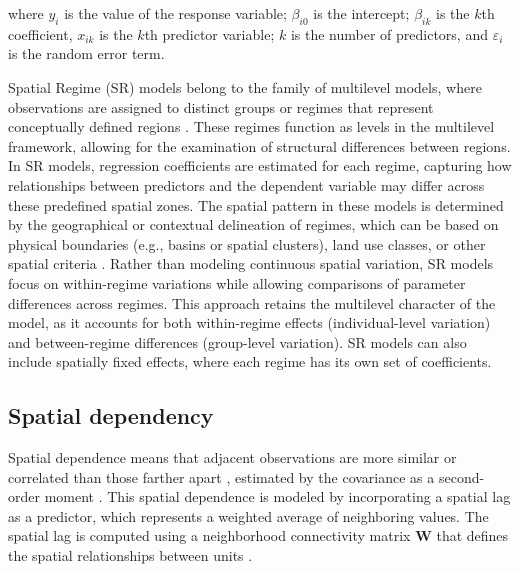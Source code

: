 \documentclass[lineno,pdflatex,sn-basic]{sn-jnl}%
\theoremstyle{thmstyleone}%
\theoremstyle{thmstyletwo}%
\theoremstyle{thmstylethree}%
\begin{document}
where $y_i$ is the value of the response variable;
$\beta_{i0}$ is the intercept; 
$\beta_{ik}$ is the $k$th coefficient, $x_{ik}$ is the $k$th predictor variable; $k$ is the number of predictors,
and $\varepsilon_i$ is the random error term. 

Spatial Regime (SR) models belong to the family of multilevel models, where observations are assigned to distinct groups or regimes that represent conceptually defined regions \citep{anselin1996simple}.
These regimes function as levels in the multilevel framework, allowing for the examination of structural differences between regions. 
In SR models, regression coefficients are estimated for each regime, capturing how relationships between predictors and the dependent variable may differ across these predefined spatial zones. 
The spatial pattern in these models is determined by the geographical or contextual delineation of regimes, which can be based on physical boundaries (e.g., basins or spatial clusters), land use classes, or other spatial criteria \citep{piras2023heterogeneous}. 
Rather than modeling continuous spatial variation, SR models focus on within-regime variations while allowing comparisons of parameter differences across regimes. 
This approach retains the multilevel character of the model, as it accounts for both within-regime effects (individual-level variation) and between-regime differences (group-level variation). 
SR models can also include spatially fixed effects, where each regime has its own set of coefficients.

\subsection{Spatial dependency}\label{sd}

Spatial dependence means that adjacent observations are more similar or correlated than those farther apart \cite{fletcher2018spatial}, estimated by the covariance as a second-order moment \cite{wickham2008applied}.
This spatial dependence is modeled by incorporating a spatial lag as a predictor, which represents a weighted average of neighboring values. The spatial lag is computed using a neighborhood connectivity matrix $\mathbf{W}$ that defines the spatial relationships between units \citep{anselin1996simple, rey2023geographic}. 
\end{document}
